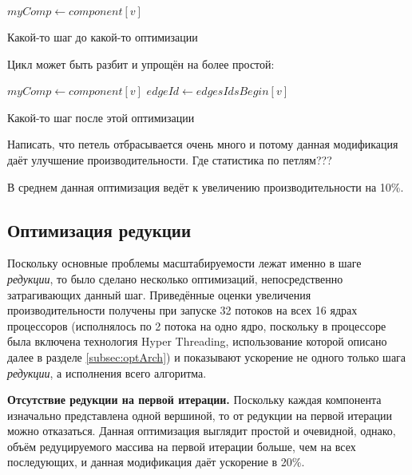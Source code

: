 \documentclass[a4paper,10pt]{extarticle}
\begin{document}
\begin{algorithm}[H]
    \SetAlgoLined
    $myComp \gets component[v]$\;
    \caption{Какой-то шаг до какой-то оптимизации}
\end{algorithm}

Цикл может быть разбит и упрощён на более простой:

\begin{algorithm}
    \SetAlgoLined
    $myComp \gets component[v]$\;
    $edgeId \gets edgesIdsBegin[v]$\;
    \caption{Какой-то шаг после этой оптимизации}
\end{algorithm}

Написать, что петель отбрасывается очень много и потому данная модификация даёт улучшение производительности. Где статистика по петлям???

В среднем данная оптимизация ведёт к увеличению производительности на 10\%.


\subsection{Оптимизация редукции}
\label{subsec:optReduction}

Поскольку основные проблемы масштабируемости лежат именно в шаге \textit{редукции}, то было сделано несколько оптимизаций, непосредственно затрагивающих данный шаг. 
Приведённые оценки увеличения производительности получены при запуске 32 потоков на всех 16 ядрах процессоров (исполнялось по 2 потока на одно ядро, поскольку в процессоре была включена технология Hyper Threading, использование которой описано далее в разделе \ref{subsec:optArch})
и показывают ускорение не одного только шага \textit{редукции}, а исполнения всего алгоритма.

\textbf{Отсутствие редукции на первой итерации.}
Поскольку каждая компонента изначально представлена одной вершиной, то от редукции на первой итерации можно отказаться. Данная оптимизация выглядит простой и очевидной, однако, объём редуцируемого массива на первой итерации больше, чем на всех последующих, и данная модификация даёт ускорение в 20\%.
\end{document}
